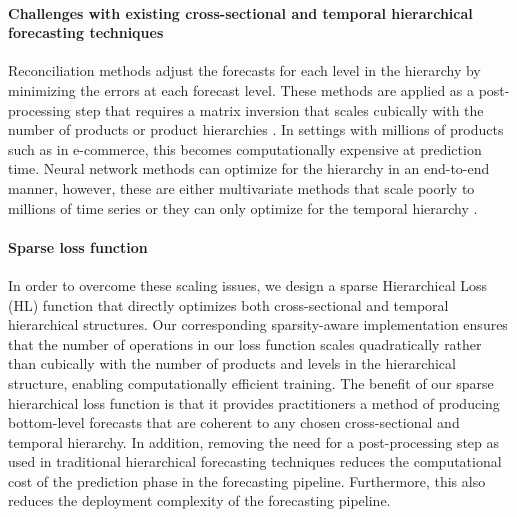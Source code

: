 \documentclass[preprint, 3p, times, twocolumn]{elsarticle}
\begin{document}

\paragraph{Challenges with existing cross-sectional and temporal hierarchical forecasting techniques} Reconciliation methods adjust the forecasts for each level in the hierarchy by minimizing the errors at each forecast level. These methods are applied as a post-processing step that requires a matrix inversion that scales cubically with the number of products or product hierarchies \cite{hyndman_optimal_2011,athanasopoulos_forecasting_2017,wickramasuriya_optimal_2019}. In settings with millions of products such as in e-commerce, this becomes computationally expensive at prediction time. Neural network methods can optimize for the hierarchy in an end-to-end manner, however, these are either multivariate methods that scale poorly to millions of time series \cite{rangapuram_endtoend_2021} or they can only optimize for the temporal hierarchy \cite{rangapuram_coherent_2023}.
  
\paragraph{Sparse loss function} In order to overcome these scaling issues, we design a sparse Hierarchical Loss (HL) function that directly optimizes both cross-sectional and temporal hierarchical structures. Our corresponding sparsity-aware implementation ensures that the number of operations in our loss function scales quadratically rather than cubically with the number of products and levels in the hierarchical structure, enabling computationally efficient training. The benefit of our sparse hierarchical loss function is that it provides practitioners a method of producing bottom-level forecasts that are coherent to any chosen cross-sectional and temporal hierarchy. In addition, removing the need for a post-processing step as used in traditional hierarchical forecasting techniques reduces the computational cost of the prediction phase in the forecasting pipeline. Furthermore, this also reduces the deployment complexity of the forecasting pipeline.
\end{document}
